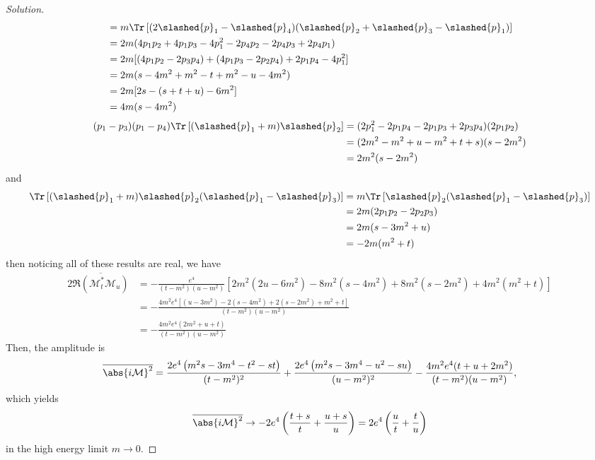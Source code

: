 \begin{proof}[Solution]
\begin{align*}
        &= m\Tr\left[(2\slashed{p}_1 - \slashed{p}_4)(\slashed{p}_2 + \slashed{p}_3 - \slashed{p}_1)\right]\\
        &= 2m (4p_1p_2 + 4p_1p_3 - 4p_1^2 - 2p_4p_2 - 2p_4p_3 + 2p_4p_1)\\
        &= 2m[(4p_1 p_2 - 2p_3 p_4) + (4p_1 p_3 - 2p_2 p_4) + 2p_1 p_4 - 4p_1^2]\\
        &= 2m(s - 4m^2 + m^2 - t + m^2 - u - 4m^2)\\
        &= 2m[2s - (s + t + u) - 6m^2]\\
        &= 4m(s - 4m^2)
    \end{align*}
    \begin{align*}
        (p_1 - p_3)(p_1 - p_4)\Tr\left[(\slashed{p}_1 + m) \slashed{p}_2\right] 
        &= (2p_1^2 - 2p_1 p_4 - 2p_1 p_3 + 2p_3 p_4)(2p_1 p_2)\\
        &= (2m^2 - m^2 + u - m^2 + t + s)(s - 2m^2)\\
        &= 2m^2 (s - 2m^2)
    \end{align*}
    and
    \begin{align*}
        \Tr\left[(\slashed{p}_1 + m)\slashed{p}_2(\slashed{p}_1 - \slashed{p}_3)\right]
        &= m \Tr\left[\slashed{p}_2 (\slashed{p}_1 - \slashed{p}_3)\right]\\
        &= 2m (2p_1 p_2 -2 p_2 p_3)\\
        &= 2m (s - 3m^2 + u)\\
        &= -2m (m^2 + t)
    \end{align*}
    then noticing all of these results are real, we have
    \begin{align*}
        2\overline{\Re(\mathcal{M}_t^*\mathcal{M}_u)} &= -\frac{e^4}{(t - m^2)(u - m^2)} \left[2m^2(2u - 6m^2) - 8m^2(s - 4m^2) + 8m^2(s - 2m^2) + 4m^2(m^2 + t)\right]\\
                                                      &= -\frac{4m^2e^4\left[(u - 3m^2) - 2(s - 4m^2) + 2(s - 2m^2) + m^2 + t\right]}{(t - m^2)(u - m^2)}\\
                                                      &= - \frac{4m^2 e^4 (2m^2 + u + t)}{(t - m^2)(u - m^2)}
    \end{align*}
    Then, the amplitude is
    \begin{equation*}
        \overline{\abs{i\mathcal{M}}^2} = \frac{2e^4\left(m^2s-3m^4 - t^2 - st\right)}{(t - m^2)^2} + \frac{2e^4\left(m^2s-3m^4 - u^2 - su\right)}{(u - m^2)^2}- \frac{4m^2 e^4(t + u + 2m^2)}{(t - m^2)(u - m^2)},
    \end{equation*}
    which yields
    \begin{equation*}
        \overline{\abs{i\mathcal{M}}^2} \to -2e^4\left(\frac{t + s}{t} + \frac{u + s}{u}\right) = 2e^4 \left(\frac{u}{t} + \frac{t}{u}\right)
    \end{equation*}
    in the high energy limit \(m \to 0.\)


\end{proof}

